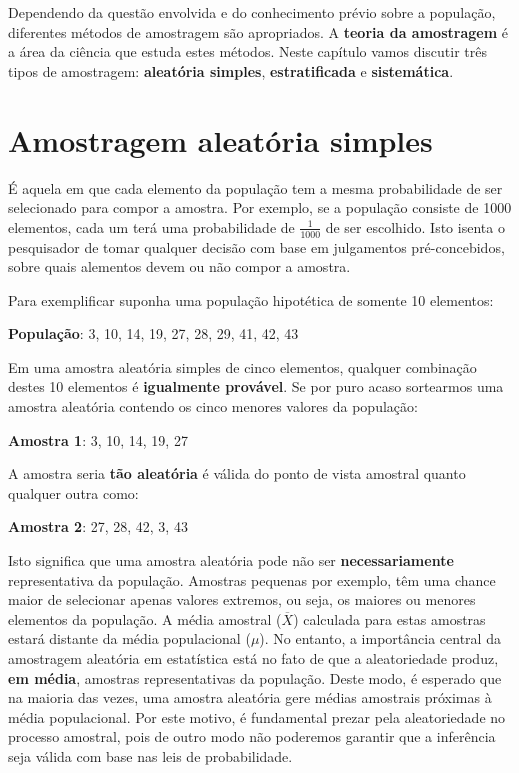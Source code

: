 \documentclass[
]{book}
\begin{document}
Dependendo da questão envolvida e do conhecimento prévio sobre a população, diferentes métodos de amostragem são apropriados. A \textbf{teoria da amostragem} é a área da ciência que estuda estes métodos. Neste capítulo vamos discutir três tipos de amostragem: \textbf{aleatória simples}, \textbf{estratificada} e \textbf{sistemática}.

\hypertarget{amostragem-aleatuxf3ria-simples}{%
\section{Amostragem aleatória simples}\label{amostragem-aleatuxf3ria-simples}}

É aquela em que cada elemento da população tem a mesma probabilidade de ser selecionado para compor a amostra. Por exemplo, se a população consiste de 1000 elementos, cada um terá uma probabilidade de \(\frac{1}{1000}\) de ser escolhido. Isto isenta o pesquisador de tomar qualquer decisão com base em julgamentos pré-concebidos, sobre quais alementos devem ou não compor a amostra.

Para exemplificar suponha uma população hipotética de somente 10 elementos:

\textbf{População}: 3, 10, 14, 19, 27, 28, 29, 41, 42, 43

Em uma amostra aleatória simples de cinco elementos, qualquer combinação destes 10 elementos é \textbf{igualmente provável}. Se por puro acaso sortearmos uma amostra aleatória contendo os cinco menores valores da população:

\textbf{Amostra 1}: 3, 10, 14, 19, 27

A amostra seria \textbf{tão aleatória} é válida do ponto de vista amostral quanto qualquer outra como:

\textbf{Amostra 2}: 27, 28, 42, 3, 43

Isto significa que uma amostra aleatória pode não ser \textbf{necessariamente} representativa da população. Amostras pequenas por exemplo, têm uma chance maior de selecionar apenas valores extremos, ou seja, os maiores ou menores elementos da população. A média amostral (\(\overline{X}\)) calculada para estas amostras estará distante da média populacional (\(\mu\)).
No entanto, a importância central da amostragem aleatória em estatística está no fato de que a aleatoriedade produz, \textbf{em média}, amostras representativas da população. Deste modo, é esperado que na maioria das vezes, uma amostra aleatória gere médias amostrais próximas à média populacional. Por este motivo, é fundamental prezar pela aleatoriedade no processo amostral, pois de outro modo não poderemos garantir que a inferência seja válida com base nas leis de probabilidade.
\end{document}
